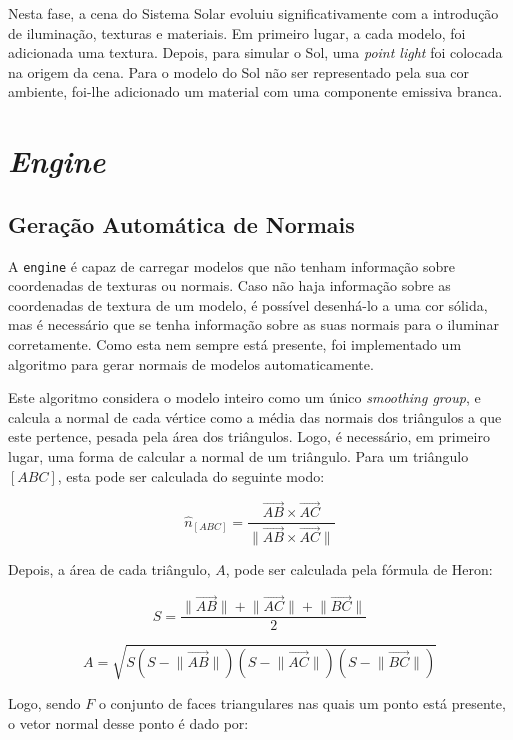 \documentclass[12pt, a4paper]{article}
\begin{document}
Nesta fase, a cena do Sistema Solar evoluiu significativamente com a introdução de iluminação,
texturas e materiais. Em primeiro lugar, a cada modelo, foi adicionada uma textura. Depois, para
simular o Sol, uma \emph{point light} foi colocada na origem da cena. Para o modelo do Sol não ser
representado pela sua cor ambiente, foi-lhe adicionado um material com uma componente emissiva
branca.

\section{\emph{Engine}}

\subsection{Geração Automática de Normais}

A \texttt{engine} é capaz de carregar modelos que não tenham informação sobre coordenadas de
texturas ou normais. Caso não haja informação sobre as coordenadas de textura de um modelo, é
possível desenhá-lo a uma cor sólida, mas é necessário que se tenha informação sobre as suas normais
para o iluminar corretamente. Como esta nem sempre está presente, foi implementado um algoritmo para
gerar normais de modelos automaticamente.

Este algoritmo considera o modelo inteiro como um único \emph{smoothing group}, e calcula a normal
de cada vértice como a média das normais dos triângulos a que este pertence, pesada pela área dos
triângulos. Logo, é necessário, em primeiro lugar, uma forma de calcular a normal de um triângulo.
Para um triângulo $[ABC]$, esta pode ser calculada do seguinte modo:

$$
\hat{n}_{[ABC]} = \frac{
    \overrightarrow{AB} \times \overrightarrow{AC}
}{
    \lVert \overrightarrow{AB} \times \overrightarrow{AC} \rVert
}
$$

Depois, a área de cada triângulo, $A$, pode ser calculada pela fórmula de Heron:

$$
S = \frac{
    \lVert \overrightarrow{AB} \rVert +
    \lVert \overrightarrow{AC} \rVert +
    \lVert \overrightarrow{BC} \rVert
}{
    2
}
$$

$$
A = \sqrt{
    S
    \left ( S - \lVert \overrightarrow{AB} \rVert \right )
    \left ( S - \lVert \overrightarrow{AC} \rVert \right )
    \left ( S - \lVert \overrightarrow{BC} \rVert \right )
}
$$

Logo, sendo $F$ o conjunto de faces triangulares nas quais um ponto está presente, o vetor normal
desse ponto é dado por:
\end{document}

